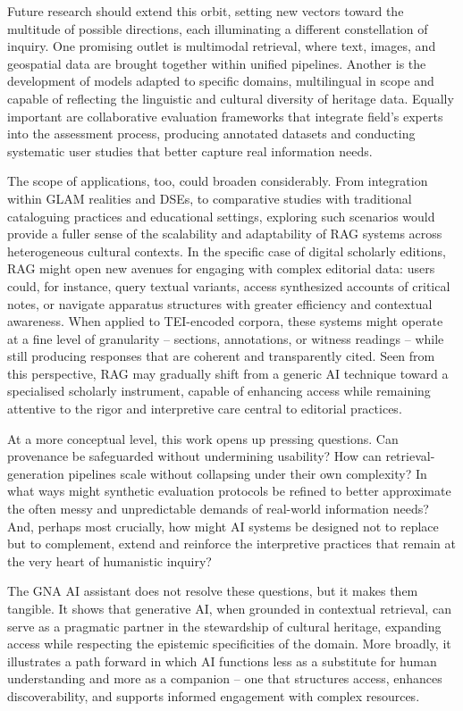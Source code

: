 \begin{spacing}{1.5}
Future research should extend this orbit, setting new vectors toward the multitude of possible directions, each illuminating a different constellation of inquiry. One promising outlet is multimodal retrieval, where text, images, and geospatial data are brought together within unified pipelines. Another is the development of models adapted to specific domains, multilingual in scope and capable of reflecting the linguistic and cultural diversity of heritage data. Equally important are collaborative evaluation frameworks that integrate field's experts into the assessment process, producing annotated datasets and conducting systematic user studies that better capture real information needs.

The scope of applications, too, could broaden considerably. From integration within GLAM realities and DSEs, to comparative studies with traditional cataloguing practices and educational settings, exploring such scenarios would provide a fuller sense of the scalability and adaptability of RAG systems across heterogeneous cultural contexts. In the specific case of digital scholarly editions, RAG might open new avenues for engaging with complex editorial data: users could, for instance, query textual variants, access synthesized accounts of critical notes, or navigate apparatus structures with greater efficiency and contextual awareness. When applied to TEI-encoded corpora, these systems might operate at a fine level of granularity -- sections, annotations, or witness readings -- while still producing responses that are coherent and transparently cited. Seen from this perspective, RAG may gradually shift from a generic AI technique toward a specialised scholarly instrument, capable of enhancing access while remaining attentive to the rigor and interpretive care central to editorial practices.

At a more conceptual level, this work opens up pressing questions. Can provenance be safeguarded without undermining usability? How can retrieval-generation pipelines scale without collapsing under their own complexity? In what ways might synthetic evaluation protocols be refined to better approximate the often messy and unpredictable demands of real-world information needs? And, perhaps most crucially, how might AI systems be designed not to replace but to complement, extend and reinforce the interpretive practices that remain at the very heart of humanistic inquiry?

The GNA AI assistant does not resolve these questions, but it makes them tangible. It shows that generative AI, when grounded in contextual retrieval, can serve as a pragmatic partner in the stewardship of cultural heritage, expanding access while respecting the epistemic specificities of the domain. More broadly, it illustrates a path forward in which AI functions less as a substitute for human understanding and more as a companion -- one that structures access, enhances discoverability, and supports informed engagement with complex resources.


\end{spacing}
